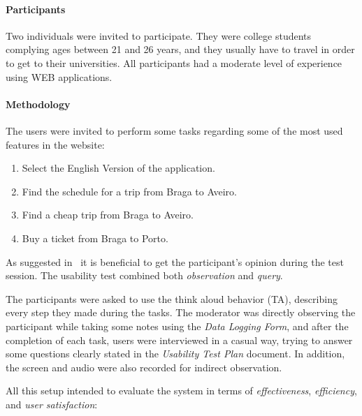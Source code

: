 \documentclass[a4paper]{article}
\begin{document}
\paragraph{Participants} Two individuals were invited to participate. They were college students complying ages between 21 and 26 years, and they usually have to travel in order to get to their universities. All participants had a moderate level of experience using WEB applications.

\begin{samepage}
\paragraph{Methodology} The users were invited to perform some tasks regarding some of the most used features in the website:

\begin{enumerate}
  \item Select the English Version of the application.
  \item Find the schedule for a trip from Braga to Aveiro.
  \item Find a cheap trip from Braga to Aveiro.
  \item Buy a ticket from Braga to Porto.
\end{enumerate}
\end{samepage}

As suggested in~\citep{mitchell2007step} it is beneficial to get the participant's opinion during the test session.
The usability test combined both \emph{observation} and \textit{query}.

The participants were asked to use the think aloud behavior (TA), describing every step they made during the tasks.
The moderator was directly observing the participant while taking some notes using the \emph{Data Logging Form}, and after the completion of each task, users were interviewed in a casual way, trying to answer some questions clearly stated in the \emph{Usability Test Plan} document.
In addition, the screen and audio were also recorded for indirect observation.
 
All this setup intended to evaluate the system in terms of \emph{effectiveness}, \emph{efficiency}, and \emph{user satisfaction}:
 
\end{document}
